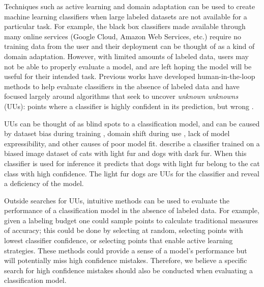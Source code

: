 \documentclass[letterpaper]{article} %
\begin{document}
Techniques such as active learning \citep{Settles2010} and domain adaptation \citep{Patel2014} can be used to create machine learning classifiers when large labeled datasets are not available for a particular task. For example, the black box classifiers made available through many online services (Google Cloud, Amazon Web Services, etc.) require no training data from the user and their deployment can be thought of as a kind of domain adaptation.  However, with limited amounts of labeled data, users may not be able to properly evaluate a model, and are left hoping the model will be useful for their intended task. Previous works have developed human-in-the-loop methods to help evaluate classifiers in the absence of labeled data and have focused largely around algorithms that seek to uncover \textit{unknown unknowns} (UUs): points where a classifier is highly confident in its prediction, but wrong \citep{Attenberg2015}. 

UUs can be thought of as blind spots to a classification model, and can be caused by dataset bias during training \citep{stock2017convnets}, domain shift during use \citep{sugiyama2017dataset}, lack of model expressibility, and other causes of poor model fit. \citet{Lakkaraju2016} describe a classifier trained on a biased image dataset of cats with light fur and dogs with dark fur. When this classifier is used for inference it predicts that dogs with light fur belong to the cat class with high confidence.  The light fur dogs are UUs for the classifier and reveal a deficiency of the model.  


Outside searches for UUs, intuitive methods can be used to evaluate the performance of a classification model in the absence of labeled data. For example, given a labeling budget one could sample points to calculate traditional measures of accuracy; this could be done by selecting at random, selecting points with lowest classifier confidence, or selecting points that enable active learning strategies.  These methods could provide a sense of a model's performance but will potentially miss high confidence mistakes. Therefore, we believe a specific search for high confidence mistakes should also be conducted when evaluating a classification model.
\end{document}
